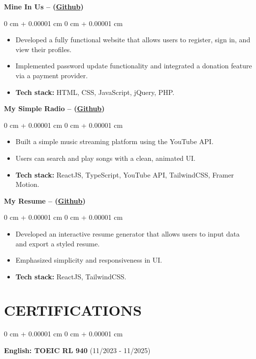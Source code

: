 \documentclass[10pt, letterpaper]{article}
\newenvironment{highlights}{
    \begin{itemize}[
        topsep=0.10 cm,
        parsep=0.10 cm,
        partopsep=0pt,
        itemsep=0pt,
        leftmargin=0 cm + 10pt
    ]
}{
    \end{itemize}
} %
\newenvironment{onecolentry}{
    \begin{adjustwidth}{
        0 cm + 0.00001 cm
    }{
        0 cm + 0.00001 cm
    }
}{
    \end{adjustwidth}
} %
\begin{document}
    \vspace{0.20 cm}
    \textbf{Mine In Us – (\href{https://github.com/holimm/MineInUs}{Github})}
    \vspace{0.10 cm}
    \begin{onecolentry}
        \begin{highlights}
            \item Developed a fully functional website that allows users to register, sign in, and view their profiles.
            \item Implemented password update functionality and integrated a donation feature via a payment provider.
            \item \textbf{Tech stack:} HTML, CSS, JavaScript, jQuery, PHP.
        \end{highlights}
    \end{onecolentry}

    
    \vspace{0.20 cm}
    \textbf{My Simple Radio – (\href{https://github.com/holimm/MySimpleRadio}{Github})}
    \vspace{0.10 cm}
    \begin{onecolentry}
        \begin{highlights}
            \item Built a simple music streaming platform using the YouTube API.
            \item Users can search and play songs with a clean, animated UI.
            \item {\bf Tech stack:} ReactJS, TypeScript, YouTube API, TailwindCSS, Framer Motion.
        \end{highlights}
    \end{onecolentry}
    
    \vspace{0.20 cm}
    \textbf{My Resume – (\href{https://github.com/holimm/MyResume}{Github})}
    \vspace{0.10 cm}
    \begin{onecolentry}
        \begin{highlights}
            \item Developed an interactive resume generator that allows users to input data and export a styled resume.
            \item Emphasized simplicity and responsiveness in UI.
            \item {\bf Tech stack:} ReactJS, TailwindCSS.
        \end{highlights}
    \end{onecolentry}
    \section{CERTIFICATIONS}
        \begin{onecolentry}
            \textbf{English: TOEIC RL 940} (11/2023 - 11/2025)  
        \end{onecolentry}

        \vspace{0.2 cm}
\end{document}
